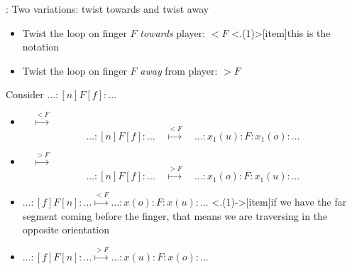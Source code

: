 
\begin{frame}{\secname: \subsecname}
\pause Two variations: twist towards and twist away
\begin{itemize}[<+(1)->]
    \item Twist the loop on finger $F$ \emph{towards} player: $<F$
    \note<.(1)>[item]{this is the notation}
    \item Twist the loop on finger $F$ \emph{away} from player: $>F$
\end{itemize}
\pause Consider $\ldots:[n]F[f]:\ldots$
\begin{itemize}[<+(1)->]
    \item{} $\quad\stackrel{<F}\mapsto\quad$ 
    $$
    \ldots:[n]F[f]:\ldots\quad\stackrel{<F}\mapsto\quad\ldots:x_1(u):F:x_1(o):\ldots
    $$
    \item {} $\quad\stackrel{>F}\mapsto\quad$ 
    $$
    \ldots:[n]F[f]:\ldots\quad\stackrel{>F}\mapsto\quad\ldots:x_1(o):F:x_1(u):\ldots
    $$
    \item $\ldots:[f]F[n]:\ldots\stackrel{<F}\mapsto \ldots:x(o):F:x(u):\ldots$
\note<.(1)->[item]{if we have the far segment coming before the finger, that means we are traversing in the opposite orientation}
    \item $\ldots:[f]F[n]:\ldots\stackrel{>F}\mapsto \ldots:x(u):F:x(o):\ldots$
\end{itemize}

\end{frame}
